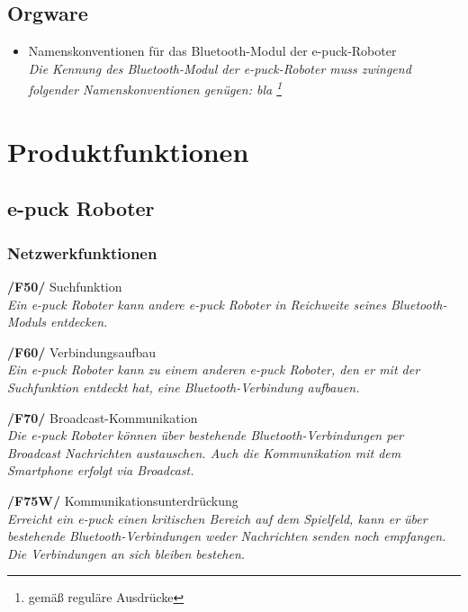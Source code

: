 \documentclass[10pt,a4paper]{article}
\begin{document}
		\subsection{Orgware}
			\begin{itemize}
				\item Namenskonventionen für das Bluetooth-Modul der e-puck-Roboter
					\\ \textsl{Die Kennung des Bluetooth-Modul der e-puck-Roboter muss zwingend folgender Namenskonventionen
						genügen: bla \footnote{gemäß reguläre Ausdrücke}  }
			\end{itemize}		
	\section{Produktfunktionen}
		\subsection{e-puck Roboter}
			\subsubsection{Netzwerkfunktionen}
				\begin{list}{}{\leftmargin=1cm}
					\item[\textbf{/F50/}] Suchfunktion
						\\ \textsl{Ein e-puck Roboter kann andere e-puck Roboter in Reichweite seines Bluetooth-Moduls entdecken.}
					\item[\textbf{/F60/}] Verbindungsaufbau
						\\ \textsl{Ein e-puck Roboter kann zu einem anderen e-puck Roboter, den er mit der Suchfunktion entdeckt
						hat, eine Bluetooth-Verbindung aufbauen.}
					\item[\textbf{/F70/}] Broadcast-Kommunikation
						\\ \textsl{Die e-puck Roboter können über bestehende Bluetooth-Verbindungen per Broadcast
						Nachrichten austauschen. Auch die Kommunikation mit dem Smartphone erfolgt via Broadcast.}
					\item[\textbf{/F75W/}] Kommunikationsunterdrückung
						\\ \textsl{Erreicht ein e-puck einen kritischen Bereich auf dem Spielfeld, kann er über bestehende
						Bluetooth-Verbindungen weder Nachrichten senden noch empfangen. Die Verbindungen an sich bleiben bestehen.}
				\end{list}
\end{document}
